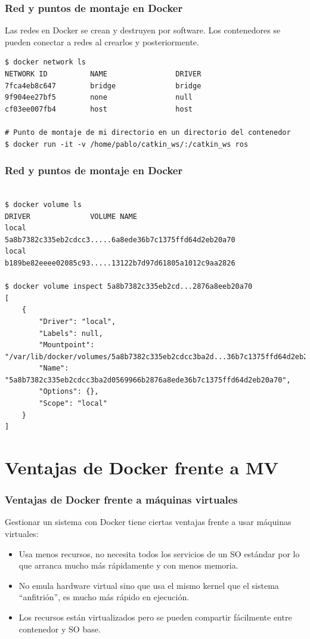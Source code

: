 \documentclass[xcolor=dvipsnames]{beamer}
\begin{document}
\begin{frame}[fragile]
	\frametitle{Red y puntos de montaje en Docker}
	
	Las redes en Docker se crean y destruyen por software. Los contenedores se pueden conectar a redes al crearlos y posteriormente.
	
		\begin{lstlisting}
$ docker network ls
NETWORK ID          NAME                DRIVER
7fca4eb8c647        bridge              bridge
9f904ee27bf5        none                null
cf03ee007fb4        host                host

# Punto de montaje de mi directorio en un directorio del contenedor
$ docker run -it -v /home/pablo/catkin_ws/:/catkin_ws ros

		\end{lstlisting}

\end{frame}


\begin{frame}[fragile]
	\frametitle{Red y puntos de montaje en Docker}
	
		\begin{lstlisting}

$ docker volume ls
DRIVER              VOLUME NAME
local               5a8b7382c335eb2cdcc3.....6a8ede36b7c1375ffd64d2eb20a70
local               b189be82eeee02085c93.....13122b7d97d61805a1012c9aa2826

$ docker volume inspect 5a8b7382c335eb2cd...2876a8eeb20a70 
[
    {
        "Driver": "local",
        "Labels": null,
        "Mountpoint": "/var/lib/docker/volumes/5a8b7382c335eb2cdcc3ba2d...36b7c1375ffd64d2eb20a70/_data",
        "Name": "5a8b7382c335eb2cdcc3ba2d0569966b2876a8ede36b7c1375ffd64d2eb20a70",
        "Options": {},
        "Scope": "local"
    }
]

		\end{lstlisting}
\end{frame}


\section{Ventajas de Docker frente a MV}
\begin{frame}
	\frametitle{Ventajas de Docker frente a máquinas virtuales}

Gestionar un sistema con Docker tiene ciertas ventajas frente a usar máquinas virtuales:

		\begin{itemize}
			\item Usa menos recursos, no necesita todos los servicios de un SO estándar por lo que arranca mucho más rápidamente y con menos memoria.
			\item No emula hardware virtual sino que usa el mismo kernel que el sistema ``anfitrión'', es mucho más rápido en ejecución.
			\item Los recursos están virtualizados pero se pueden compartir fácilmente entre contenedor y SO base. 
		\end{itemize}
\end{frame}
\end{document}
